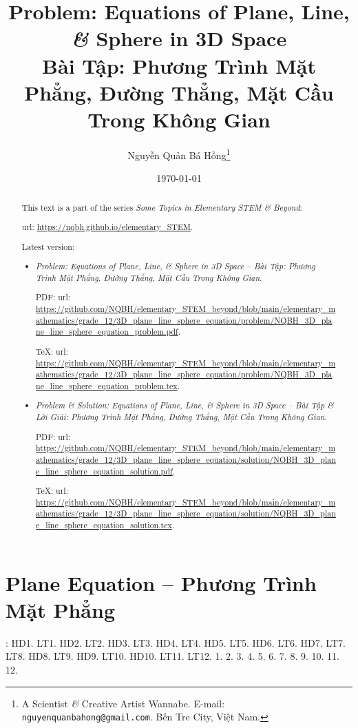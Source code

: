 \documentclass{article}
\title{Problem: Equations of Plane, Line, {\it\&} Sphere in 3D Space\\Bài Tập: Phương Trình Mặt Phẳng, Đường Thẳng, Mặt Cầu Trong Không Gian}
\author{Nguyễn Quản Bá Hồng\footnote{A Scientist {\it\&} Creative Artist Wannabe. E-mail: {\tt nguyenquanbahong@gmail.com}. Bến Tre City, Việt Nam.}}
\date{\today}
\begin{document}
\maketitle
\begin{abstract}
	This text is a part of the series {\it Some Topics in Elementary STEM \& Beyond}:
	
	{\sc url}: \url{https://nqbh.github.io/elementary_STEM}.
	
	Latest version:
	\begin{itemize}
		\item {\it Problem: Equations of Plane, Line, {\it\&} Sphere in 3D Space -- Bài Tập: Phương Trình Mặt Phẳng, Đường Thẳng, Mặt Cầu Trong Không Gian}.
		
		PDF: {\sc url}: \url{https://github.com/NQBH/elementary_STEM_beyond/blob/main/elementary_mathematics/grade_12/3D_plane_line_sphere_equation/problem/NQBH_3D_plane_line_sphere_equation_problem.pdf}.
		
		\TeX: {\sc url}: \url{https://github.com/NQBH/elementary_STEM_beyond/blob/main/elementary_mathematics/grade_12/3D_plane_line_sphere_equation/problem/NQBH_3D_plane_line_sphere_equation_problem.tex}.
		\item {\it Problem \& Solution: Equations of Plane, Line, {\it\&} Sphere in 3D Space -- Bài Tập \& Lời Giải: Phương Trình Mặt Phẳng, Đường Thẳng, Mặt Cầu Trong Không Gian}.
		
		PDF: {\sc url}: \url{https://github.com/NQBH/elementary_STEM_beyond/blob/main/elementary_mathematics/grade_12/3D_plane_line_sphere_equation/solution/NQBH_3D_plane_line_sphere_equation_solution.pdf}.
		
		\TeX: {\sc url}: \url{https://github.com/NQBH/elementary_STEM_beyond/blob/main/elementary_mathematics/grade_12/3D_plane_line_sphere_equation/solution/NQBH_3D_plane_line_sphere_equation_solution.tex}.
	\end{itemize}
\end{abstract}
\tableofcontents


\section{Plane Equation -- Phương Trình Mặt Phẳng}
\cite[Chap. V, \S1, pp. 50--64]{SGK_Toan_12_Canh_Dieu_tap_2}: HD1. LT1. HD2. LT2. HD3. LT3. HD4. LT4. HD5. LT5. HD6. LT6. HD7. LT7. LT8. HD8. LT9. HD9. LT10. HD10. LT11. LT12. 1. 2. 3. 4. 5. 6. 7. 8. 9. 10. 11. 12.
\end{document}
